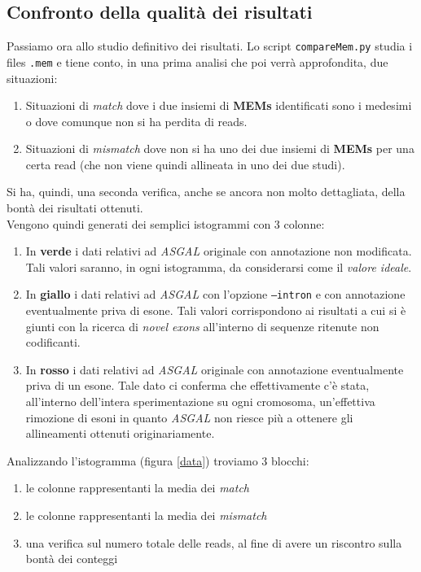 \documentclass[a4paper,12pt, oneside]{book}
\begin{document}
\subsection{Confronto della qualità dei risultati}
Passiamo ora allo studio definitivo dei risultati. Lo script
\texttt{compareMem.py} studia i files \texttt{.mem} e tiene conto,
in una prima analisi che poi verrà approfondita, due situazioni:
\begin{enumerate}
  \item Situazioni di \textit{match} dove i due insiemi di \textbf{MEMs}
  identificati sono i medesimi o dove comunque non si ha perdita di reads.
  \item Situazioni di \textit{mismatch} dove non si ha uno dei due insiemi di
  \textbf{MEMs} per una certa read (che non viene quindi allineata in uno dei
  due studi).
\end{enumerate}
Si ha, quindi, una seconda verifica, anche se ancora non molto dettagliata,
della bontà dei risultati ottenuti.\\
Vengono quindi generati dei semplici istogrammi con 3 colonne:
\begin{enumerate}
  \item In \textbf{verde} i dati relativi ad \textit{ASGAL} originale con
  annotazione non modificata. Tali valori saranno, in ogni istogramma, da
  considerarsi come il \textit{valore ideale}.
  \item In \textbf{giallo} i dati relativi ad \textit{ASGAL} con l'opzione
  \texttt{--intron} e con annotazione eventualmente priva di esone. Tali valori
  corrispondono ai risultati a cui si è giunti con la ricerca di \textit{novel
    exons} all'interno di sequenze ritenute non codificanti.
  \item In \textbf{rosso} i dati relativi ad \textit{ASGAL} originale con
  annotazione eventualmente priva di un esone. Tale dato ci conferma che
  effettivamente c'è stata, all'interno dell'intera sperimentazione su ogni
  cromosoma, un'effettiva rimozione di esoni in quanto \textit{ASGAL} non riesce
  più a ottenere gli allineamenti ottenuti originariamente.
\end{enumerate}
Analizzando l'istogramma (figura \ref{data}) troviamo 3 blocchi:
\begin{enumerate}
  \item le colonne rappresentanti la media dei \textit{match}
  \item le colonne rappresentanti la media dei \textit{mismatch}
  \item una verifica sul numero totale delle reads, al fine di avere un
  riscontro sulla bontà dei conteggi
\end{enumerate}
\end{document}
